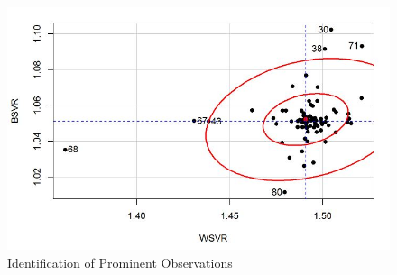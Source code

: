 \begin{figure}[h!]
	\centering
	\includegraphics[width=0.9\linewidth]{08-plot1}
	\caption{Identification of Prominent Observations}
	\label{fig:08-plot1}
\end{figure}
